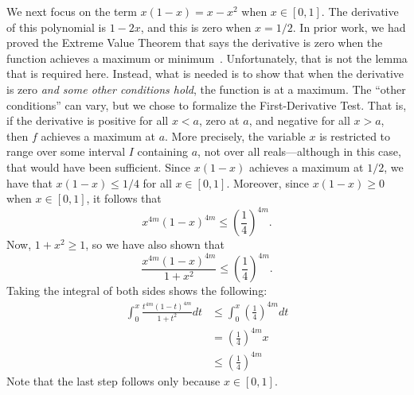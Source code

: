 \documentclass[copyright,creativecommons]{eptcs}
\begin{document}
We next focus on the term $x(1-x)=x-x^2$ when $x\in[0,1]$. The
derivative of this polynomial is $1-2x$, and this is zero when
$x=1/2$. In prior work, we had proved the Extreme Value Theorem that
says the derivative is zero when the function achieves a maximum or
minimum~\cite{Gam:dissertation}. Unfortunately, that is not the lemma
that is required here. Instead, what is needed is to show that when
the derivative is zero \emph{and some other conditions hold}, the
function is at a maximum.  The ``other conditions'' can vary, but we
chose to formalize the First-Derivative Test. That
is, if the derivative is positive for all $x<a$, zero at $a$, and
negative for all $x>a$, then $f$ achieves a maximum at $a$.
More precisely, the variable $x$ is restricted to range over some
interval $I$ containing $a$, not over all reals---although in this
case, that would have been sufficient. Since $x(1-x)$ achieves a
maximum at $1/2$, we have that $x(1-x) \le 1/4$ for all $x\in[0,1]$.
Moreover, since $x(1-x)\ge 0$ when $x\in[0,1]$, it follows that
\begin{equation}
x^{4m}(1-x)^{4m}\le \left(\frac{1}{4}\right)^{4m}.
\end{equation}
Now, $1+x^2 \ge 1$, so we have also shown that 
\begin{equation}
\frac{x^{4m}(1-x)^{4m}}{1+x^2} \le \left(\frac{1}{4}\right)^{4m}.
\end{equation}
Taking the integral of both sides shows the following:
\begin{align}
\int_{0}^{x}\frac{t^{4m}(1-t)^{4m}}{1+t^2} dt &\le \int_{0}^{x} \left(\frac{1}{4}\right)^{4m} dt \\
&=\left(\frac{1}{4}\right)^{4m} x \\
&\le \left(\frac{1}{4}\right)^{4m} \label{medina-bound}
\end{align}
Note that the last step follows only because $x\in[0,1]$.
\end{document}
